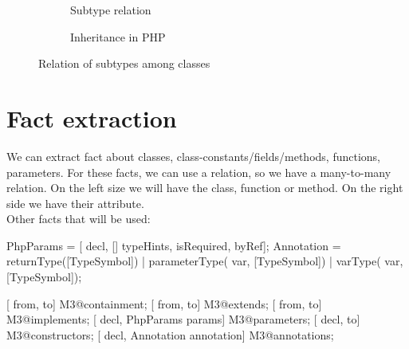 \documentclass[../main.tex]{subfiles}
\begin{document}
\begin{figure}[H]
\begin{subfigure}[b]{.33\textwidth}
\begin{center}
      \caption{Subtype relation}
      \label{subtype_tc}
      \end{center}
    \end{subfigure}
    \begin{subfigure}[b]{.33\textwidth}
      \begin{center}
      
      \caption{Inheritance in PHP}
      \label{subtype_code}
      \end{center}
    \end{subfigure}
    \caption{Relation of subtypes among classes}
    \label{fig:subtypes}
    \end{figure}
    
    \section{Fact extraction}\label{sec:fact_extraction}
    We can extract fact about classes, class-constants/fields/methods, functions, parameters.
    For these facts, we can use a relation, so we have a many-to-many relation.
    On the left size we will have the class, function or method. On the right side we have their attribute.
    \\
 
    Other facts that will be used:
    \begin{rascal} 
 PhpParams = [ decl, [] typeHints,  isRequired,  byRef];
 Annotation = returnType([TypeSymbol]) | parameterType( var, [TypeSymbol])
    | varType( var, [TypeSymbol]);

 [ from,  to] M3@containment;          
 [ from,  to] M3@extends;              
 [ from,  to] M3@implements;           
 [ decl, PhpParams params] M3@parameters; 
 [ decl,  to] M3@constructors;         
 [ decl, Annotation annotation] M3@annotations;  

    \end{rascal}
    
\end{document}
